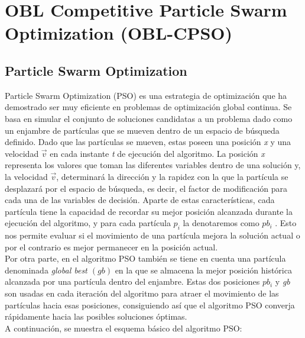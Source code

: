
\bigskip

\section{OBL Competitive Particle Swarm Optimization (OBL-CPSO)}
\label{sec:OBL-CPSO}

\subsection{Particle Swarm Optimization}
Particle Swarm Optimization (PSO) \cite{metabook, comparison, PSO_KA, GPSO} es una estrategia de optimización que ha demostrado ser muy eficiente en problemas de optimización global continua. Se basa en simular el conjunto de soluciones candidatas a un problema dado como un enjambre de partículas que se mueven dentro de un espacio de búsqueda definido. Dado que las partículas se mueven, estas poseen una posición \textit{x} y una velocidad $\overrightarrow{v}$ en cada instante \textit{t} de ejecución del algoritmo. La posición \textit{x} representa los valores que toman las diferentes variables dentro de una solución y, la velocidad $\overrightarrow{v}$, determinará la dirección y la rapidez con la que la partícula se desplazará por el espacio de búsqueda, es decir, el factor de modificación para cada una de las variables de decisión. Aparte de estas características, cada partícula tiene la capacidad de recordar su mejor posición alcanzada durante la ejecución del algoritmo, y para cada partícula $p_{i}$ la denotaremos como $pb_{i}$ \cite{metabook}. Esto nos permite evaluar si el movimiento de una partícula mejora la solución actual o por el contrario es mejor permanecer en la posición actual. \\

Por otra parte, en el algoritmo PSO también se tiene en cuenta una partícula denominada \textit{global best $(gb)$} en la que se almacena la mejor posición histórica alcanzada por una partícula dentro del enjambre. Estas dos posiciones $pb_{i}$ y \textit{gb} son usadas en cada iteración del algoritmo para atraer el movimiento de las partículas hacia esas posiciones, consiguiendo así que el algoritmo PSO converja rápidamente hacia las posibles soluciones óptimas. \\
A continuación, se muestra el esquema básico del algoritmo PSO: 

\newpage

